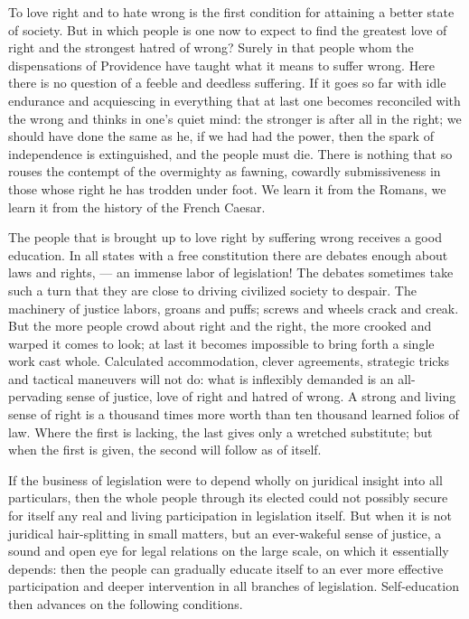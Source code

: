 \documentclass[12pt,a4paper,openany]{book}
\newcommand{\opage}[1]{\marginnote{\footnotesize\textit{[#1]}}}
\newcounter{lect}
\begin{document}
To love right and to hate wrong is the first condition
for attaining a better state of society. But
\setcounter{footnote}{0}%
\opage{99}in which people is one now to expect to find the greatest
love of right and the strongest hatred of wrong?
Surely in that people whom the dispensations of Providence have taught
what it means to suffer wrong. Here there is no question of
a feeble and deedless suffering. If it goes so far with
idle endurance and acquiescing in everything that at last one
becomes reconciled with the wrong and thinks in one's quiet
mind: the stronger is after all in the right; we should
have done the same as he, if we had had the
power, then the spark of independence is extinguished, and
the people must die. There is nothing that so rouses
the contempt of the overmighty as fawning, cowardly submissiveness
in those whose right he has trodden under
foot. We learn it from the Romans, we learn it from the history of the
French Caesar.

The people that is brought up to love right by
suffering wrong receives a good education. In all
states with a free constitution there are debates enough about laws
and rights, --- an immense labor of legislation! The debates
sometimes take such a turn that
they are close to driving civilized society to
despair. The machinery of justice labors, groans and puffs;
screws and wheels crack and creak. But the more
people crowd about right and the right, the more crooked and
warped it comes to look; at last it becomes
impossible to bring forth a single work cast whole. Calculated
accommodation, clever agreements, strategic
tricks and tactical maneuvers will not do:
what is inflexibly demanded is an all-pervading sense of
justice, love of right and hatred of wrong. A strong and living sense of right is a thousand
times more worth than ten thousand learned folios of law.
\setcounter{footnote}{0}%
\opage{100}Where the first is lacking, the last gives only a
wretched substitute; but when the first is given,
the second will follow as of itself.

If the business of legislation were to depend wholly
on juridical insight into all particulars,
then the whole people through its elected could not possibly secure
for itself any real and living participation in legislation
itself. But when it is not juridical hair-splitting in
small matters, but an ever-wakeful sense of justice, a
sound and open eye for legal relations on the large scale,
on which it essentially depends: then the people can
gradually educate itself to an ever more effective
participation and deeper intervention in all branches
of legislation. Self-education then advances on the following
conditions.
\end{document}
